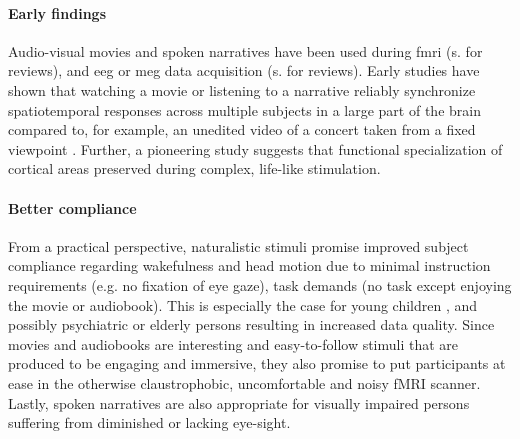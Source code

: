 \paragraph{Early findings}
Audio-visual movies and spoken narratives have been used during \ac{fmri}
(s.\citet{hamilton2018revolution, hasson2008neurocinematics,
sonkusare2019naturalistic, saarimaki2021naturalistic}
for reviews), and \ac{eeg} or \ac{meg} data acquisition (s. \citet{alday2019meg,
kandylaki2019story} for reviews).
%
Early studies have shown that watching a movie \citep{hasson2004intersubject,
hasson2008neurocinematics, hasson2010reliability} or listening to a
narrative \citep{lerner2011topographic, wilson2008beyond} reliably synchronize spatiotemporal responses across multiple subjects
in a large part of the brain compared to, for example, an unedited video of a
concert taken from a fixed viewpoint \citep{hasson2004intersubject,
hasson2008neurocinematics, hasson2010reliability, lerner2011topographic,
wilson2008beyond}.
%
Further, a pioneering study \citep{bartels2004mapping} suggests that functional
specialization of cortical areas preserved during complex, life-like
stimulation.


\paragraph{Better compliance}
%
From a practical perspective, naturalistic stimuli promise improved subject
compliance regarding wakefulness and head motion due to minimal instruction
requirements (e.g. no fixation of eye gaze), task demands (no task except
enjoying the movie or audiobook).
%
This is especially the case for young children \citep{vanderwal2015inscapes},
and possibly psychiatric \citep{eickhoff2020towards} or elderly persons
resulting in increased data quality.
%
Since movies and audiobooks are interesting and easy-to-follow stimuli that are
produced to be engaging and immersive, they also promise to put participants at
ease in the otherwise claustrophobic, uncomfortable and noisy fMRI scanner.
%
Lastly, spoken narratives are also appropriate for visually impaired persons
suffering from diminished or lacking eye-sight.

